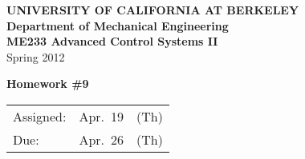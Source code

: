 \documentclass[letterpaper,12pt]{article}
\begin{document}
\begin{center}
    {\bf UNIVERSITY OF CALIFORNIA AT BERKELEY}\\
    {\bf Department of Mechanical Engineering}\\
    {\bf ME233 Advanced Control Systems II}\\
    Spring 2012\\
\end{center}
\noindent
{\Large \bf Homework \#9 }\\[-3em]
\begin{flushright}
\begin{tabular} {lll}
    Assigned: &  Apr.\ 19 & (Th) \\
    Due: & Apr.\ 26 & (Th)
\end{tabular}
\end{flushright}

\begin{enumerate}



\newpage

\newpage

\newpage


\end{enumerate}
\end{document}

